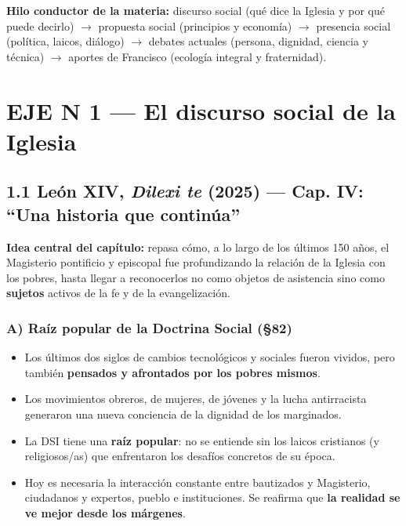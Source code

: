 \documentclass[10pt,a4paper]{article}
\begin{document}
\noindent \textbf{Hilo conductor de la materia:} discurso social (qué dice la Iglesia y por qué puede decirlo) $\rightarrow$ propuesta social (principios y economía) $\rightarrow$ presencia social (política, laicos, diálogo) $\rightarrow$ debates actuales (persona, dignidad, ciencia y técnica) $\rightarrow$ aportes de Francisco (ecología integral y fraternidad).\par\smallskip



\clearpage\section{EJE N\textordmasculine{} 1 --- El discurso social de la Iglesia}

\subsection{1.1 León XIV, \textit{Dilexi te} (2025) --- Cap. IV: ``Una historia que continúa''}

\noindent \textbf{Idea central del capítulo:} repasa cómo, a lo largo de los últimos 150 años, el Magisterio pontificio y episcopal fue profundizando la relación de la Iglesia con los pobres, hasta llegar a reconocerlos no como objetos de asistencia sino como \textbf{sujetos} activos de la fe y de la evangelización.\par\smallskip

\subsubsection{A) Raíz popular de la Doctrina Social (\S{}82)}
\begin{itemize}
\item Los últimos dos siglos de cambios tecnológicos y sociales fueron vividos, pero también \textbf{pensados y afrontados por los pobres mismos}.
\item Los movimientos obreros, de mujeres, de jóvenes y la lucha antirracista generaron una nueva conciencia de la dignidad de los marginados.
\item La DSI tiene una \textbf{raíz popular}: no se entiende sin los laicos cristianos (y religiosos/as) que enfrentaron los desafíos concretos de su época.
\item Hoy es necesaria la interacción constante entre bautizados y Magisterio, ciudadanos y expertos, pueblo e instituciones. Se reafirma que \textbf{la realidad se ve mejor desde los márgenes}.
\end{itemize}
\end{document}
